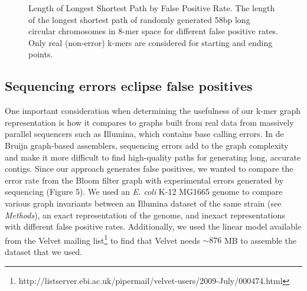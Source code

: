 \documentclass[12pt]{article} \usepackage{simplemargins}
\begin{document}
\begin{figure}
\caption{Length of Longest Shortest Path by False Positive Rate. The 
length of the longest shortest path of randomly generated 58bp 
long circular chromosomes in 8-mer 
space for different false positive rates. Only real (non-error) k-mers are
considered for starting and ending points.}
\end{figure}

\subsection{Sequencing errors eclipse false positives}
One important consideration when determining the usefulness of our
k-mer graph representation is how it compares to graphs built from
real data from massively parallel sequencers such as Illumina, which
contains base calling errors.  In de Bruijn graph-based assemblers,
sequencing errors add to the graph complexity and make it more
difficult to find high-quality paths for generating long, accurate
contigs. Since our approach generates false positives, we wanted to
compare the error rate from the Bloom filter graph with experimental
errors generated by sequencing (Figure 5). We used an
\emph{E. coli} K-12 MG1665 genome to compare various graph invariants
between an Illumina dataset of the same strain (see \emph{Methods}),
an exact representation of the genome, and inexact representations
with different false positive rates. Additionally, we used the linear 
model available 
from the Velvet mailing list\footnote{http://listserver.ebi.ac.uk/pipermail/velvet-users/2009-July/000474.html} to find that Velvet needs $\sim 876$ MB 
to assemble the dataset that we used.
\end{document}
